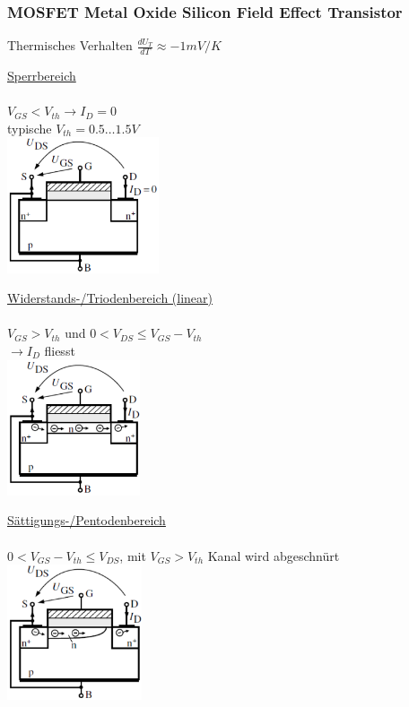   \subsubsection{MOSFET Metal Oxide Silicon Field Effect Transistor}
    Thermisches Verhalten $\frac{dU_T}{dT} \approx -1 mV/K$ \\
    \begin{minipage}[T]{6cm}
      \underline{Sperrbereich}\\\\
      $V_{GS} < V_{th} \to I_D = 0$\\
      typische $V_{th} = 0.5 \ldots 1.5V$\\ 
      \includegraphics[height=4cm]{./bilder/MOSFETSperrbereich.png}
    \end{minipage}
    \begin{minipage}[T]{6cm}
      \underline{Widerstands-/Triodenbereich (linear)}\\\\
      $V_{GS} > V_{th} $ und $0 < V_{DS} \leq V_{GS} - V_{th}$\\
      $\to I_D$ fliesst\\
      \includegraphics[height=4cm]{./bilder/MOSFETLinBereich.png}
    \end{minipage}
    \begin{minipage}[T]{6cm}
      \underline{S\"attigungs-/Pentodenbereich}\\\\
      $0 < V_{GS} - V_{th} \leq V_{DS}$, mit $V_{GS} > V_{th}$ Kanal wird abgeschn\"urt\\
      \includegraphics[height=4cm]{./bilder/MOSFETSaettBereich.png}
    \end{minipage}\\
            
